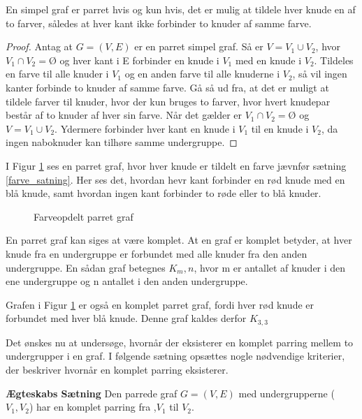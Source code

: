 \begin{thm}
En simpel graf er parret hvis og kun hvis, det er mulig at tildele hver knude en af to farver, således at hver kant ikke forbinder to knuder af samme farve. 
\label{farve_satning}
\end{thm}

\begin{proof}
Antag at $G=(V,E)$ er en parret simpel graf. Så er $V=V_1 \cup V_2$, hvor $V_1 \cap V_2 = Ø$ og hver kant i E forbinder en knude i $V_1$ med en knude i $V_2$. 
Tildeles en farve til alle knuder i $V_1$ og en anden farve til alle knuderne i $V_2$, så vil ingen kanter forbinde to knuder af samme farve. 
Gå så ud fra, at det er muligt at tildele farver til knuder, hvor der kun bruges to farver, hvor hvert knudepar består af to knuder af hver sin farve.
Når det gælder er $V_1 \cap V_2=Ø$ og $V=V_1 \cup V_2$.
Ydermere forbinder hver kant en knude i $V_1$ til en knude i $V_2$, da ingen naboknuder kan tilhøre samme undergruppe. 
\end{proof}

\begin{exmp}
I Figur \ref{farve_graf} ses en parret graf, hvor hver knude er tildelt en farve jævnfør sætning \ref{farve_satning}. 
Her ses det, hvordan hevr kant forbinder en rød knude med en blå knude, samt hvordan ingen kant forbinder to røde eller to blå knuder.

\begin{figure}[h]
\centering
{}
\caption{Farveopdelt parret graf}
\label{farve_graf}
\end{figure}
\end{exmp}

En parret graf kan siges at være komplet. 
At en graf er komplet betyder, at hver knude fra en undergruppe er forbundet med alle knuder fra den anden undergruppe. 
En sådan graf betegnes $K_m,n$, hvor m er antallet af knuder i den ene undergruppe og n antallet i den anden undergruppe. 

\begin{exmp}
Grafen i Figur \ref{farve_graf} er også en komplet parret graf, fordi hver rød knude er forbundet med hver blå knude. 
Denne graf kaldes derfor $K_{3,3}$
\end{exmp}

Det ønskes nu at undersøge, hvornår der eksisterer en komplet parring mellem to undergrupper i en graf. 
I følgende sætning opsættes nogle nødvendige kriterier, der beskriver hvornår en komplet parring eksisterer. 

\begin{thm}[Bla]
\textbf{Ægteskabs Sætning}
Den parrede graf $G=(V,E)$ med undergrupperne ($V_1,V_2$) har en komplet parring fra ,$V_1$ til $V_2$.
\end{thm}
